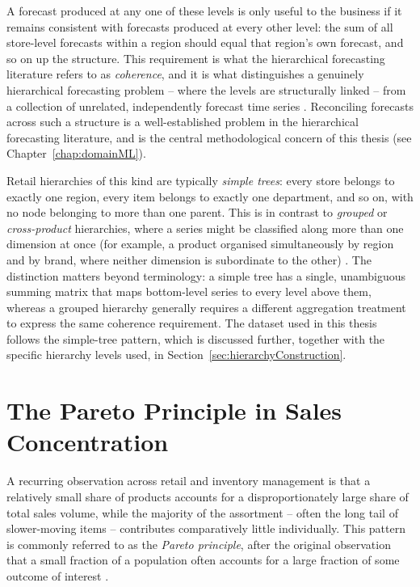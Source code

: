 A forecast produced at any one of these levels is only useful to the business if it remains consistent with forecasts produced at every other level: the sum of all store-level forecasts within a region should equal that region's own forecast, and so on up the structure. This requirement is what the hierarchical forecasting literature refers to as \emph{coherence}, and it is what distinguishes a genuinely hierarchical forecasting problem -- where the levels are structurally linked -- from a collection of unrelated, independently forecast time series \cite{Hyndman:2018}. Reconciling forecasts across such a structure is a well-established problem in the hierarchical forecasting literature, and is the central methodological concern of this thesis (see Chapter~\ref{chap:domainML}).

Retail hierarchies of this kind are typically \emph{simple trees}: every store belongs to exactly one region, every item belongs to exactly one department, and so on, with no node belonging to more than one parent. This is in contrast to \emph{grouped} or \emph{cross-product} hierarchies, where a series might be classified along more than one dimension at once (for example, a product organised simultaneously by region and by brand, where neither dimension is subordinate to the other) \cite{Hyndman:2018}. The distinction matters beyond terminology: a simple tree has a single, unambiguous summing matrix that maps bottom-level series to every level above them, whereas a grouped hierarchy generally requires a different aggregation treatment to express the same coherence requirement. The dataset used in this thesis follows the simple-tree pattern, which is discussed further, together with the specific hierarchy levels used, in Section~\ref{sec:hierarchyConstruction}.

\section{The Pareto Principle in Sales Concentration}
\label{sec:paretoPrinciple}

A recurring observation across retail and inventory management is that a relatively small share of products accounts for a disproportionately large share of total sales volume, while the majority of the assortment -- often the long tail of slower-moving items -- contributes comparatively little individually. This pattern is commonly referred to as the \emph{Pareto principle}, after the original observation that a small fraction of a population often accounts for a large fraction of some outcome of interest \cite{Pareto:1896}.

